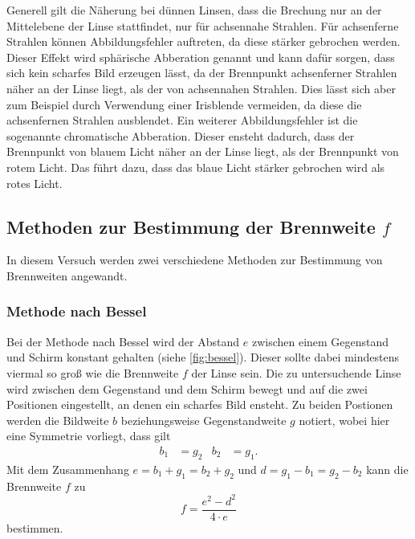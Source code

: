     Generell gilt die Näherung bei dünnen Linsen, dass die Brechung nur an der Mittelebene der Linse stattfindet, nur für achsennahe 
    Strahlen. Für achsenferne Strahlen können Abbildungsfehler auftreten, da diese stärker gebrochen werden. Dieser Effekt wird
    sphärische Abberation genannt und kann dafür sorgen, dass sich kein scharfes Bild erzeugen lässt, 
    da der Brennpunkt achsenferner Strahlen näher an der Linse liegt, als der von
    achsennahen Strahlen. Dies lässt sich aber zum Beispiel durch Verwendung einer Irisblende
    vermeiden, da diese die achsenfernen Strahlen ausblendet. Ein weiterer Abbildungsfehler ist die sogenannte chromatische Abberation.
    Dieser ensteht dadurch, dass der Brennpunkt von blauem Licht näher an der Linse liegt, als der Brennpunkt von rotem Licht. Das
    führt dazu, dass das blaue Licht stärker gebrochen wird als rotes Licht.

    \subsection{Methoden zur Bestimmung der Brennweite $f$} 
    In diesem Versuch werden zwei verschiedene Methoden zur Bestimmung von Brennweiten angewandt. 
    \subsubsection{Methode nach Bessel}
        Bei der Methode nach Bessel wird der Abstand $e$ zwischen einem Gegenstand und Schirm konstant gehalten (siehe \autoref{fig:bessel}).
        Dieser sollte dabei mindestens viermal so groß wie die Brennweite $f$ der Linse sein. Die zu untersuchende Linse wird zwischen dem
        Gegenstand und dem Schirm bewegt und auf die zwei Positionen eingestellt, an denen ein scharfes Bild ensteht. Zu beiden Postionen
        werden die Bildweite $b$ beziehungsweise Gegenstandweite $g$ notiert, wobei hier eine Symmetrie vorliegt, dass gilt
        \begin{align*}
        b_1 &= g_2 & b_2 &= g_1.
        \end{align*}
        Mit dem Zusammenhang $e = b_1 + g_1 = b_2 + g_2$ und $d = g_1 - b_1 = g_2 - b_2$ kann die Brennweite $f$ zu 
        \begin{equation}
        \label{eqn:bessel}
        f = \frac{e^2 -d^2}{4 \cdot e}
        \end{equation}
        bestimmen.
